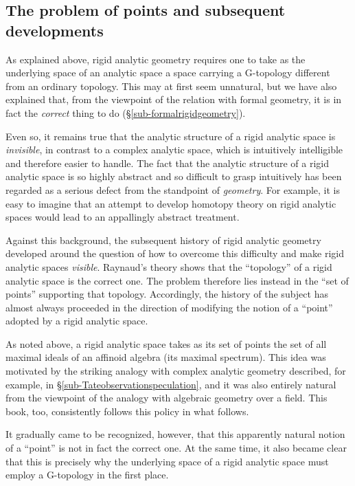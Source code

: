 \documentclass[a4paper,12pt, dvipdfmx]{jsbook}
\theoremstyle{plain}
\theoremstyle{definition}
\begin{document}
\subsection{The problem of points and subsequent developments}\label{sub-pointsproblem}
As explained above, rigid analytic geometry requires one to take as the underlying space of an analytic space a space carrying a G-topology different from an ordinary topology.
This may at first seem unnatural, but we have also explained that, from the viewpoint of the relation with formal geometry, it is in fact the {\it correct} thing to do (\S\ref{sub-formalrigidgeometry}).

Even so, it remains true that the analytic structure of a rigid analytic space is {\it invisible}, in contrast to a complex analytic space, which is intuitively intelligible and therefore easier to handle.
The fact that the analytic structure of a rigid analytic space is so highly abstract and so difficult to grasp intuitively has been regarded as a serious defect from the standpoint of {\it geometry}.
For example, it is easy to imagine that an attempt to develop homotopy theory on rigid analytic spaces would lead to an appallingly abstract treatment.

Against this background, the subsequent history of rigid analytic geometry developed around the question of how to overcome this difficulty and make rigid analytic spaces {\it visible}.
Raynaud's theory shows that the ``topology'' of a rigid analytic space is the correct one.
The problem therefore lies instead in the ``set of points'' supporting that topology.
Accordingly, the history of the subject has almost always proceeded in the direction of modifying the notion of a ``point'' adopted by a rigid analytic space.

As noted above, a rigid analytic space takes as its set of points the set of all maximal ideals of an affinoid algebra (its maximal spectrum).
This idea was motivated by the striking analogy with complex analytic geometry described, for example, in \S\ref{sub-Tateobservationspeculation}, and it was also entirely natural from the viewpoint of the analogy with algebraic geometry over a field.
This book, too, consistently follows this policy in what follows.

It gradually came to be recognized, however, that this apparently natural notion of a ``point'' is not in fact the correct one.
At the same time, it also became clear that this is precisely why the underlying space of a rigid analytic space must employ a G-topology in the first place.
\end{document}
